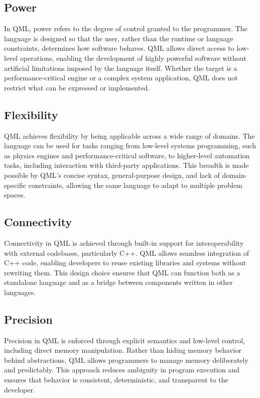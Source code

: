 \documentclass[12pt]{report}
\begin{document}
	\subsection*{Power}
	
	In QML, power refers to the degree of control granted to the programmer. The language is designed so that the user, rather than the runtime or language constraints, determines how software behaves. QML allows direct access to low-level operations, enabling the development of highly powerful software without artificial limitations imposed by the language itself. Whether the target is a performance-critical engine or a complex system application, QML does not restrict what can be expressed or implemented.
	
	\subsection*{Flexibility}
	
	QML achieves flexibility by being applicable across a wide range of domains. The language can be used for tasks ranging from low-level systems programming, such as physics engines and performance-critical software, to higher-level automation tasks, including interaction with third-party applications. This breadth is made possible by QML’s concise syntax, general-purpose design, and lack of domain-specific constraints, allowing the same language to adapt to multiple problem spaces.
	
	\subsection*{Connectivity}
	
	Connectivity in QML is achieved through built-in support for interoperability with external codebases, particularly C++. QML allows seamless integration of C++ code, enabling developers to reuse existing libraries and systems without rewriting them. This design choice ensures that QML can function both as a standalone language and as a bridge between components written in other languages.
	
	\subsection*{Precision}
	
	Precision in QML is enforced through explicit semantics and low-level control, including direct memory manipulation. Rather than hiding memory behavior behind abstractions, QML allows programmers to manage memory deliberately and predictably. This approach reduces ambiguity in program execution and ensures that behavior is consistent, deterministic, and transparent to the developer.
	
\end{document}
